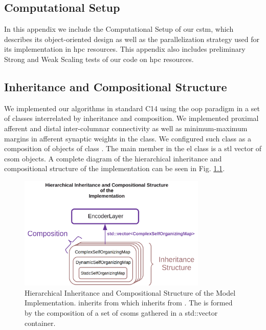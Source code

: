 \documentclass{book}
\newcommand{\CC}{C\nolinebreak\hspace{-.05em}\raisebox{.4ex}{\tiny\bf +}\nolinebreak\hspace{-.10em}\raisebox{.4ex}{\tiny\bf +}}
\begin{document}

\begin{appendices}

\chapter{Computational Setup}
\label{Comp_setup}

In this appendix we include the Computational Setup of our \gls{cstm}, which describes its object-oriented design as well as the parallelization strategy used for its implementation in \gls{hpc} resources. This appendix also includes preliminary Strong and Weak Scaling tests of our code on \gls{hpc} resources.


\section{Inheritance and Compositional Structure}

We implemented our algorithms in standard \CC14 using the \gls{oop} paradigm in a set of classes interrelated by inheritance and composition. We implemented proximal afferent and distal inter-columnar connectivity as well as minimum-maximum margins in afferent synaptic weights in the  class. We configured such class as a composition of objects of class . The main member in the \gls{el} class is a \gls{stl} vector of \gls{csom} objects. A complete diagram of the hierarchical inheritance and compositional structure of the implementation can be seen in Fig. \ref{fig:Skeleton}.

\begin{figure}[h!]
    \centering
    \includegraphics[width=0.8\textwidth]{Skeleton.png}
    \caption{Hierarchical Inheritance and Compositional Structure of the Model Implementation.
     inherits from  which inherits from .
    The  is formed by the composition of a set of \glspl{csom} gathered
    in a std::vector  container.}
    \label{fig:Skeleton}
\end{figure}


\end{appendices}
\end{document}
